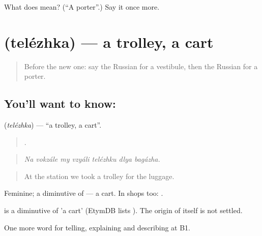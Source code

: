\begin{tcolorbox}[breakable,colback=teal!4,colframe=teal!35!black,title={Before you move on}]
What does  mean? (\textquotedblleft{}A porter\textquotedblright{}.) Say it once more.
\end{tcolorbox}
\section[\texorpdfstring{\ru{тележка} (telézhka)}{тележка (telézhka)}]{ (telézhka) — a trolley, a cart}

\label{lesson:RU-C416-telezhka}



\begin{quote}
Before the new one: say the Russian for a vestibule, then the Russian for a porter.
\end{quote}

\subsection*{You'll want to know: }
\textbf{} (\emph{telézhka}) — \textquotedblleft{}a trolley, a cart\textquotedblright{}.

\begin{quote}
      .
\end{quote}

\begin{quote}
\emph{Na vokzále my vzyáli telézhku dlya bagázha.}
\end{quote}

\begin{quote}
At the station we took a trolley for the luggage.
\end{quote}

Feminine; a diminutive of \emph{} — a cart. In shops too: \emph{  }.

\begin{cousinweb}
\emph{} is a diminutive of \emph{} 'a cart' (EtymDB lists \emph{}). The origin of \emph{} itself is not settled.
\end{cousinweb}

\begin{grammarlens}[title={What you've built}]
One more word for telling, explaining and describing at B1.
\end{grammarlens}

